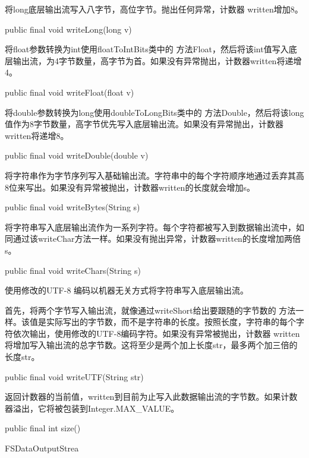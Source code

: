 将long底层输出流写入八字节，高位字节。抛出任何异常，计数器 written增加8。
\begin{java}
public final void writeLong(long v)
\end{java}
将float参数转换为int使用floatToIntBits类中的 方法Float，然后将该int值写入底层输出流，为4字节数量，高字节为首。如果没有异常抛出，计数器written将递增4。

\begin{java}
public final void writeFloat(float v)
\end{java}

将double参数转换为long使用doubleToLongBits类中的 方法Double，然后将该long值作为8字节数量，高字节优先写入底层输出流。如果没有异常抛出，计数器written将递增8。

\begin{java}
public final void writeDouble(double v)
\end{java}

将字符串作为字节序列写入基础输出流。字符串中的每个字符顺序地通过丢弃其高8位来写出。如果没有异常被抛出，计数器written的长度就会增加s。
\begin{java}
public final void writeBytes(String  s)
\end{java}

将字符串写入底层输出流作为一系列字符。每个字符都被写入到数据输出流中，如同通过该writeChar方法一样。如果没有抛出异常，计数器written的长度增加两倍s。
\begin{java}
public final void writeChars(String  s)
\end{java}

使用修改的UTF-8 编码以机器无关方式将字符串写入底层输出流。

首先，将两个字节写入输出流，就像通过writeShort给出要跟随的字节数的 方法一样。该值是实际写出的字节数，而不是字符串的长度。按照长度，字符串的每个字符依次输出，使用修改的UTF-8编码字符。如果没有异常被抛出，计数器 written将增加写入输出流的总字节数。这将至少是两个加上长度str，最多两个加三倍的长度str。


\begin{java}
public final void writeUTF(String str)
\end{java}

返回计数器的当前值，written到目前为止写入此数据输出流的字节数。如果计数器溢出，它将被包装到Integer.MAX\_VALUE。
\begin{java}
public final int size()
\end{java}


FSDataOutputStrea

